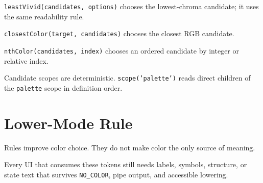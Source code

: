 \texttt{l\allowbreak{}e\allowbreak{}a\allowbreak{}s\allowbreak{}t\allowbreak{}V\allowbreak{}i\allowbreak{}v\allowbreak{}i\allowbreak{}d\allowbreak{}(\allowbreak{}c\allowbreak{}a\allowbreak{}n\allowbreak{}d\allowbreak{}i\allowbreak{}d\allowbreak{}a\allowbreak{}t\allowbreak{}e\allowbreak{}s\allowbreak{},\allowbreak{} \allowbreak{}o\allowbreak{}p\allowbreak{}t\allowbreak{}i\allowbreak{}o\allowbreak{}n\allowbreak{}s\allowbreak{})} chooses the lowest-chroma candidate; it uses the same readability rule.

\texttt{c\allowbreak{}l\allowbreak{}o\allowbreak{}s\allowbreak{}e\allowbreak{}s\allowbreak{}t\allowbreak{}C\allowbreak{}o\allowbreak{}l\allowbreak{}o\allowbreak{}r\allowbreak{}(\allowbreak{}t\allowbreak{}a\allowbreak{}r\allowbreak{}g\allowbreak{}e\allowbreak{}t\allowbreak{},\allowbreak{} \allowbreak{}c\allowbreak{}a\allowbreak{}n\allowbreak{}d\allowbreak{}i\allowbreak{}d\allowbreak{}a\allowbreak{}t\allowbreak{}e\allowbreak{}s\allowbreak{})} chooses the closest RGB candidate.

\texttt{n\allowbreak{}t\allowbreak{}h\allowbreak{}C\allowbreak{}o\allowbreak{}l\allowbreak{}o\allowbreak{}r\allowbreak{}(\allowbreak{}c\allowbreak{}a\allowbreak{}n\allowbreak{}d\allowbreak{}i\allowbreak{}d\allowbreak{}a\allowbreak{}t\allowbreak{}e\allowbreak{}s\allowbreak{},\allowbreak{} \allowbreak{}i\allowbreak{}n\allowbreak{}d\allowbreak{}e\allowbreak{}x\allowbreak{})} chooses an ordered candidate by integer or relative index.

Candidate scopes are deterministic. \texttt{s\allowbreak{}c\allowbreak{}o\allowbreak{}p\allowbreak{}e\allowbreak{}(\allowbreak{}'\allowbreak{}p\allowbreak{}a\allowbreak{}l\allowbreak{}e\allowbreak{}t\allowbreak{}t\allowbreak{}e\allowbreak{}'\allowbreak{})} reads direct children of the \texttt{p\allowbreak{}a\allowbreak{}l\allowbreak{}e\allowbreak{}t\allowbreak{}t\allowbreak{}e} scope in definition order.

\section{Lower-Mode Rule}\label{record-027-lower-mode-rule}

Rules improve color choice. They do not make color the only source of meaning.

Every UI that consumes these tokens still needs labels, symbols, structure, or state text that survives \texttt{N\allowbreak{}O\allowbreak{}\_\allowbreak{}C\allowbreak{}O\allowbreak{}L\allowbreak{}O\allowbreak{}R}, pipe output, and accessible lowering.


